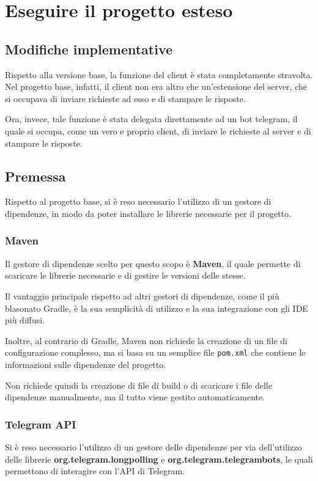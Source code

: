 \section{Eseguire il progetto esteso}

\subsection{Modifiche implementative}

Rispetto alla versione base,  la funzione del client è stata completamente stravolta. Nel progetto base, infatti, il client non era altro che un'estensione del server, che si occupava di inviare richieste ad esso e di stampare le risposte. 

Ora, invece, tale funzione è stata delegata direttamente ad un bot telegram, il quale si occupa, come un vero e proprio client, di inviare le richieste al server e di stampare le risposte.


\subsection{Premessa}

Rispetto al progetto base, si è reso necessario l'utilizzo di un gestore di dipendenze, in modo da poter installare le librerie necessarie per il progetto. 

\subsubsection*{Maven}

Il gestore di dipendenze scelto per questo scopo è \textbf{Maven}, il quale permette di scaricare le librerie necessarie e di gestire le versioni delle stesse.

Il vantaggio principale rispetto ad altri gestori di dipendenze, come il più blasonato Gradle, è la sua semplicità di utilizzo e la sua integrazione con gli IDE più diffusi. 

Inoltre, al contrario di Gradle, Maven non richiede la creazione di un file di configurazione complesso, ma si basa su un semplice file \texttt{pom.xml} che contiene le informazioni sulle dipendenze del progetto. 

Non richiede quindi la creazione di file di build o di scaricare i file delle dipendenze manualmente, ma il tutto viene gestito automaticamente. 

\subsubsection*{Telegram API}

Si è reso necessario l'utilizzo di un gestore delle dipendenze per via dell'utilizzo delle librerie \textbf{org.telegram.longpolling} e \textbf{org.telegram.telegrambots}, le quali permettono di interagire con l'API di Telegram. 
